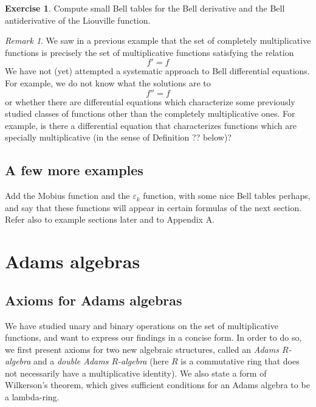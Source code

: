 \documentclass[a4paper]{article}
\theoremstyle{definition}
\newtheorem{exercise}{Exercise}[section]
\theoremstyle{remark}
\newtheorem*{remark}{Remark}
\begin{document}
\begin{exercise}
Compute small Bell tables for the Bell derivative and the Bell antiderivative of the Liouville function.
\end{exercise}



\begin{remark}
We saw in a previous example that the set of completely multiplicative functions is precisely the set of multiplicative functions satisfying the relation
$$ f' = f $$
We have not (yet) attempted a systematic approach to Bell differential equations. For example, we do not know what the solutions are to 
$$ f'' = f   $$
or whether there are differential equations which characterize some previously studied classes of functions other than the completely multiplicative ones. For example, is there a differential equation that characterizes functions which are specially multiplicative (in the sense of Definition ?? below)?
\end{remark}


\subsection{A few more examples}

Add the Mobius function and the $\varepsilon_k$ function, with some nice Bell tables perhaps, and say that these functions will appear in certain formulas of the next section. Refer also to example sections later and to Appendix A.

\section{Adams algebras}

\subsection{Axioms for Adams algebras}

We have studied unary and binary operations on the set of multiplicative functions, and want to express our findings in a concise form. In order to do so, we first present axioms for two new algebraic structures, called an \emph{Adams $R$-algebra} and a \emph{double Adams $R$-algebra} (here $R$ is a commutative ring that does not necessarily have a multiplicative identity). We also state a form of Wilkerson's theorem, which gives sufficient conditions for an Adams algebra to be a lambda-ring.
\end{document}
